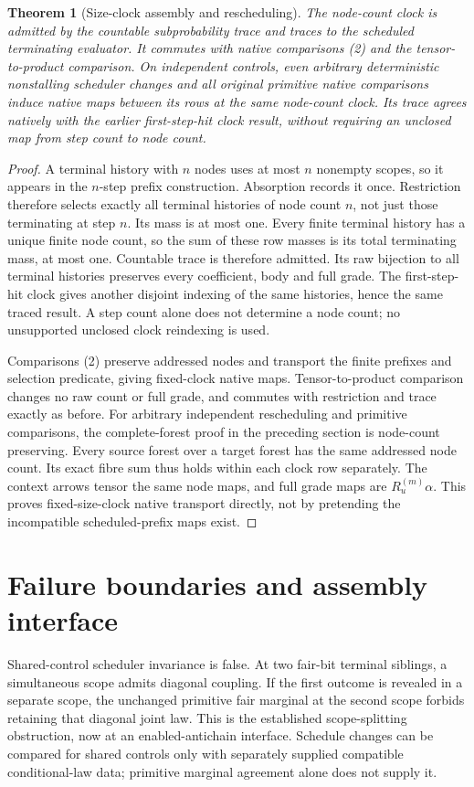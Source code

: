 \documentclass[11pt]{article}
\newtheorem{theorem}{Theorem}\newtheorem{proposition}[theorem]{Proposition}
\begin{document}
\begin{theorem}[Size-clock assembly and rescheduling]
The node-count clock is admitted by the countable subprobability trace and traces to the scheduled terminating evaluator. It commutes with native comparisons (2) and the tensor-to-product comparison. On independent controls, even arbitrary deterministic nonstalling scheduler changes and all original primitive native comparisons induce native maps between its rows at the \emph{same node-count clock}. Its trace agrees natively with the earlier first-step-hit clock result, without requiring an unclosed map from step count to node count.
\end{theorem}
\begin{proof}
A terminal history with $n$ nodes uses at most $n$ nonempty scopes, so it appears in the $n$-step prefix construction. Absorption records it once. Restriction therefore selects exactly all terminal histories of node count $n$, not just those terminating at step $n$. Its mass is at most one. Every finite terminal history has a unique finite node count, so the sum of these row masses is its total terminating mass, at most one. Countable trace is therefore admitted. Its raw bijection to all terminal histories preserves every coefficient, body and full grade. The first-step-hit clock gives another disjoint indexing of the same histories, hence the same traced result. A step count alone does not determine a node count; no unsupported unclosed clock reindexing is used.

Comparisons (2) preserve addressed nodes and transport the finite prefixes and selection predicate, giving fixed-clock native maps. Tensor-to-product comparison changes no raw count or full grade, and commutes with restriction and trace exactly as before. For arbitrary independent rescheduling and primitive comparisons, the complete-forest proof in the preceding section is node-count preserving. Every source forest over a target forest has the same addressed node count. Its exact fibre sum thus holds within each clock row separately. The context arrows tensor the same node maps, and full grade maps are $R_u^{(m)}\alpha$. This proves fixed-size-clock native transport directly, not by pretending the incompatible scheduled-prefix maps exist.
\end{proof}

\section{Failure boundaries and assembly interface}
Shared-control scheduler invariance is false. At two fair-bit terminal siblings, a simultaneous scope admits diagonal coupling. If the first outcome is revealed in a separate scope, the unchanged primitive fair marginal at the second scope forbids retaining that diagonal joint law. This is the established scope-splitting obstruction, now at an enabled-antichain interface. Schedule changes can be compared for shared controls only with separately supplied compatible conditional-law data; primitive marginal agreement alone does not supply it.
\end{document}
